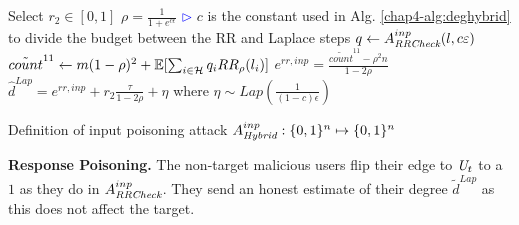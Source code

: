 %
%

\begin{algorithm}[bt]
	Select $r_2 \in [0,1]$\;
	$\rho = \frac{1}{1+e^{c\epsilon}}$\;
	\hfill\textcolor{blue}{$\rhd$} $c$ is the constant used in Alg. \ref{chap4-alg:deghybrid} to divide the budget between the RR and Laplace steps\;
	$q \gets A_{\textit{RRCheck}}^{inp}(l, c\varepsilon)$\;
	$\tilde{count}^{11} \gets m(1-\rho)^2 + \operatorname{\mathbb{E}}[\sum_{i \in \mathcal{H}} q_i RR_\rho(l_i)]$\;
	$ e^{rr,inp} = \frac{\tilde{count}^{11} - \rho^2 n}{1-2\rho}$\;
	$ \hat{d}^{Lap} = e^{rr,inp} + r_2 \frac{\tau}{1-2\rho} + \eta$ where $\eta \sim Lap(\frac{1}{(1-c)\epsilon})$\;
\caption[Definition of input poisoning attack $A_{\DegHybrid}^{inp}$.]{Definition of input poisoning attack $A_{\textit{Hybrid}}^{inp}: \{0,1\}^n\mapsto\{0,1\}^n$ }\label{chap4-alg:att-resp-inf2}
\end{algorithm}

\noindent\textbf{Response Poisoning.}
The non-target malicious users flip their edge to $\textit{U}_t$ to a $1$ as they do in $A_{\textit{RRCheck}{}}^{inp}$. They send an honest estimate of their degree $\tilde{d}^{Lap}$ as this does not affect the target.

